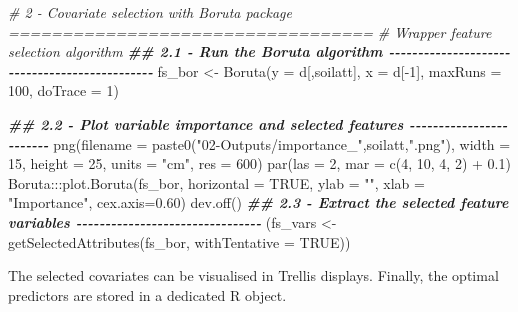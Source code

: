 \documentclass[
  10pt,
  b5paper,
  oneside]{book}
\newenvironment{Shaded}{\begin{snugshade}}{\end{snugshade}}
\newcommand{\AttributeTok}[1]{\textcolor[rgb]{0.77,0.63,0.00}{#1}}
\newcommand{\CommentTok}[1]{\textcolor[rgb]{0.56,0.35,0.01}{\textit{#1}}}
\newcommand{\ConstantTok}[1]{\textcolor[rgb]{0.00,0.00,0.00}{#1}}
\newcommand{\DecValTok}[1]{\textcolor[rgb]{0.00,0.00,0.81}{#1}}
\newcommand{\DocumentationTok}[1]{\textcolor[rgb]{0.56,0.35,0.01}{\textbf{\textit{#1}}}}
\newcommand{\FloatTok}[1]{\textcolor[rgb]{0.00,0.00,0.81}{#1}}
\newcommand{\FunctionTok}[1]{\textcolor[rgb]{0.00,0.00,0.00}{#1}}
\newcommand{\NormalTok}[1]{#1}
\newcommand{\OtherTok}[1]{\textcolor[rgb]{0.56,0.35,0.01}{#1}}
\newcommand{\SpecialCharTok}[1]{\textcolor[rgb]{0.00,0.00,0.00}{#1}}
\newcommand{\StringTok}[1]{\textcolor[rgb]{0.31,0.60,0.02}{#1}}
\begin{document}
\begin{Shaded}
\begin{Highlighting}[]
  \CommentTok{\# 2 {-} Covariate selection with Boruta package ==================================}
  \CommentTok{\# Wrapper feature selection algorithm}
  \DocumentationTok{\#\# 2.1 {-} Run the Boruta algorithm {-}{-}{-}{-}{-}{-}{-}{-}{-}{-}{-}{-}{-}{-}{-}{-}{-}{-}{-}{-}{-}{-}{-}{-}{-}{-}{-}{-}{-}{-}{-}{-}{-}{-}{-}{-}{-}{-}{-}{-}{-}{-}{-}{-}{-}{-}}
\NormalTok{  fs\_bor }\OtherTok{\textless{}{-}} \FunctionTok{Boruta}\NormalTok{(}\AttributeTok{y =}\NormalTok{ d[,soilatt], }\AttributeTok{x =}\NormalTok{ d[}\SpecialCharTok{{-}}\DecValTok{1}\NormalTok{], }\AttributeTok{maxRuns =} \DecValTok{100}\NormalTok{, }\AttributeTok{doTrace =} \DecValTok{1}\NormalTok{)}
  
  \DocumentationTok{\#\# 2.2 {-} Plot variable importance and selected features {-}{-}{-}{-}{-}{-}{-}{-}{-}{-}{-}{-}{-}{-}{-}{-}{-}{-}{-}{-}{-}{-}{-}{-}}
  \FunctionTok{png}\NormalTok{(}\AttributeTok{filename =} \FunctionTok{paste0}\NormalTok{(}\StringTok{"02{-}Outputs/importance\_"}\NormalTok{,soilatt,}\StringTok{".png"}\NormalTok{), }
       \AttributeTok{width =} \DecValTok{15}\NormalTok{, }\AttributeTok{height =} \DecValTok{25}\NormalTok{, }\AttributeTok{units =} \StringTok{"cm"}\NormalTok{, }\AttributeTok{res =} \DecValTok{600}\NormalTok{)}
  \FunctionTok{par}\NormalTok{(}\AttributeTok{las =} \DecValTok{2}\NormalTok{, }\AttributeTok{mar =} \FunctionTok{c}\NormalTok{(}\DecValTok{4}\NormalTok{, }\DecValTok{10}\NormalTok{, }\DecValTok{4}\NormalTok{, }\DecValTok{2}\NormalTok{) }\SpecialCharTok{+} \FloatTok{0.1}\NormalTok{)}
\NormalTok{  Boruta}\SpecialCharTok{:::}\FunctionTok{plot.Boruta}\NormalTok{(fs\_bor, }\AttributeTok{horizontal =} \ConstantTok{TRUE}\NormalTok{, }\AttributeTok{ylab =} \StringTok{""}\NormalTok{,}
                       \AttributeTok{xlab =} \StringTok{"Importance"}\NormalTok{, }\AttributeTok{cex.axis=}\FloatTok{0.60}\NormalTok{)}
  \FunctionTok{dev.off}\NormalTok{()}
  \DocumentationTok{\#\# 2.3 {-} Extract the selected feature variables {-}{-}{-}{-}{-}{-}{-}{-}{-}{-}{-}{-}{-}{-}{-}{-}{-}{-}{-}{-}{-}{-}{-}{-}{-}{-}{-}{-}{-}{-}{-}{-}}
\NormalTok{  (fs\_vars }\OtherTok{\textless{}{-}} \FunctionTok{getSelectedAttributes}\NormalTok{(fs\_bor, }\AttributeTok{withTentative =} \ConstantTok{TRUE}\NormalTok{))}
\end{Highlighting}
\end{Shaded}

The selected covariates can be visualised in Trellis displays. Finally, the optimal predictors are stored in a dedicated R object.
\end{document}
